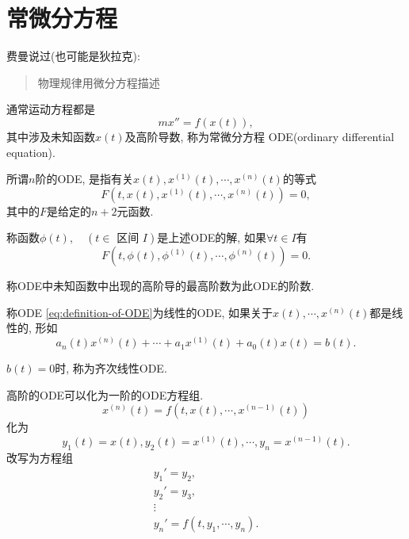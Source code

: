 
\section{常微分方程}
费曼说过(也可能是狄拉克):
\begin{quote}
  物理规律用微分方程描述
\end{quote}
通常运动方程都是
\begin{equation}
  m x'' = f\left( x\left( t \right) \right),
\end{equation}
其中涉及未知函数$x(t)$及高阶导数, 称为常微分方程 ODE(ordinary differential equation).

\begin{definition}[ODE]
  所谓$n$阶的ODE, 是指有关$x(t), x^{(1)}(t), \cdots , x^{(n)}(t)$的等式
  \begin{equation}\label{eq:definition-of-ODE}
    F\left( t, x(t), x^{(1)}(t), \cdots ,x^{(n)}(t) \right) = 0,
  \end{equation}
  其中的$F$是给定的$n+2$元函数.

  称函数$\phi (t), \quad (t \in \text{ 区间 $I$})$是上述ODE的解, 如果$\forall t \in I$有
  \begin{equation}
    F\left( t, \phi (t), \phi ^{(1)}(t), \cdots ,\phi ^{(n)}(t) \right) = 0.
  \end{equation}

  称ODE中未知函数中出现的高阶导的最高阶数为此ODE的阶数.
\end{definition}


\begin{example}[线性ODE]
  称ODE \eqref{eq:definition-of-ODE}为线性的ODE, 如果关于$x(t), \cdots , x^{(n)}(t)$都是线性的, 形如
  \begin{equation}
    a_n(t) x^{(n)}(t) + \cdots + a_1 x^{(1)}(t) + a_0(t) x (t) = b(t).
  \end{equation}

  $b(t) = 0$时, 称为齐次线性ODE.
\end{example}

\begin{example}
  高阶的ODE可以化为一阶的ODE方程组.
  \begin{equation}
    x^{(n)}(t) = f (t, x(t), \cdots , x^{(n-1)}(t))
  \end{equation}
  化为
  \begin{equation}
    y_1(t) = x(t), y_2 (t) = x^{(1)}(t), \cdots , y_n = x^{(n-1)}(t).
  \end{equation}
  改写为方程组
  \begin{equation}
    \begin{gathered}
      y_1' = y_2, \\
      y_2' = y_3, \\
      \vdots \\
      y_n' = f(t, y_1,\cdots ,y_{n}).
    \end{gathered}
  \end{equation}
\end{example}

